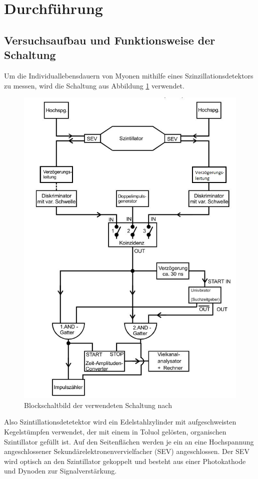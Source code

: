 \section{Durchführung}
\label{sec:Durchführung}
\subsection{Versuchsaufbau und Funktionsweise der Schaltung}
\label{sub:aufbau}
Um die Individuallebensdauern von Myonen mithilfe eines Szinzillationsdetektors zu messen, wird die Schaltung aus Abbildung \ref{fig:schaltung} verwendet.
\begin{figure}[H]
  \centering
  \includegraphics{./content/blockschaltbild.JPG}
  \caption{Blockschaltbild der verwendeten Schaltung nach \cite{Anleitung}}
  \label{fig:schaltung}
\end{figure}
Also Szintillationsdetetektor wird ein Edelstahlzylinder mit aufgeschweisten Kegelstümpfen verwendet, der mit einem in Toluol gelösten, organischen Szintillator gefüllt ist. Auf den Seitenflächen werden je ein an eine Hochspannung angeschlossener Sekundärelektronenvervielfacher (SEV) angeschlossen. Der SEV wird optisch an den Szintillator gekoppelt und besteht aus einer Photokathode und Dynoden zur Signalverstärkung.\\
